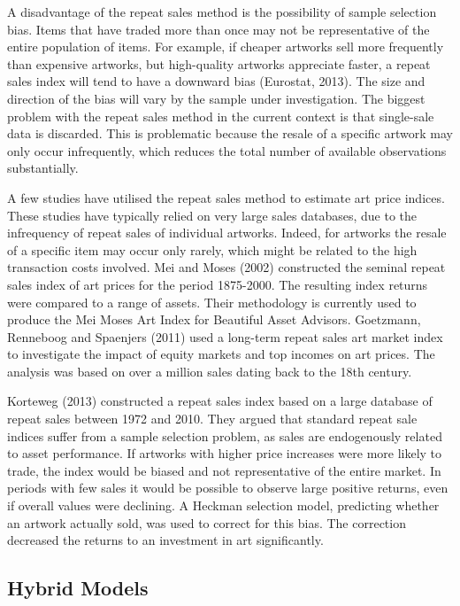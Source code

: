 \documentclass[12pt,]{article}
\begin{document}
A disadvantage of the repeat sales method is the possibility of sample
selection bias. Items that have traded more than once may not be
representative of the entire population of items. For example, if
cheaper artworks sell more frequently than expensive artworks, but
high-quality artworks appreciate faster, a repeat sales index will tend
to have a downward bias (Eurostat, 2013). The size and direction of the
bias will vary by the sample under investigation. The biggest problem
with the repeat sales method in the current context is that single-sale
data is discarded. This is problematic because the resale of a specific
artwork may only occur infrequently, which reduces the total number of
available observations substantially.

A few studies have utilised the repeat sales method to estimate art
price indices. These studies have typically relied on very large sales
databases, due to the infrequency of repeat sales of individual
artworks. Indeed, for artworks the resale of a specific item may occur
only rarely, which might be related to the high transaction costs
involved. Mei and Moses (2002) constructed the seminal repeat sales
index of art prices for the period 1875-2000. The resulting index
returns were compared to a range of assets. Their methodology is
currently used to produce the Mei Moses Art Index for Beautiful Asset
Advisors. Goetzmann, Renneboog and Spaenjers (2011) used a long-term
repeat sales art market index to investigate the impact of equity
markets and top incomes on art prices. The analysis was based on over a
million sales dating back to the 18th century.

Korteweg (2013) constructed a repeat sales index based on a large
database of repeat sales between 1972 and 2010. They argued that
standard repeat sale indices suffer from a sample selection problem, as
sales are endogenously related to asset performance. If artworks with
higher price increases were more likely to trade, the index would be
biased and not representative of the entire market. In periods with few
sales it would be possible to observe large positive returns, even if
overall values were declining. A Heckman selection model, predicting
whether an artwork actually sold, was used to correct for this bias. The
correction decreased the returns to an investment in art significantly.

\subsection{Hybrid Models}\label{hybrid-models}
\end{document}
